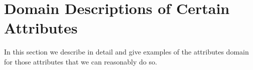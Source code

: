 \documentclass{article}
\begin{document}
\section{Domain Descriptions of Certain Attributes}
In this section we describe in detail and give examples of the attributes domain for those attributes that we can reasonably do so.
\end{document}
